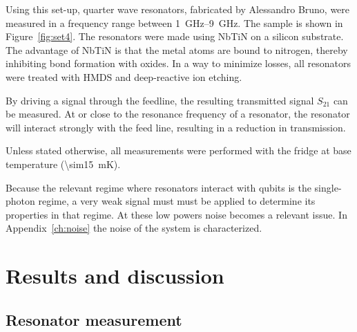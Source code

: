   Using this set-up, quarter wave resonators, fabricated by Alessandro Bruno, were measured in a frequency range between \SIrange{1}{9}{\giga \hertz}. The sample is shown in Figure~\ref{fig:set4}. The resonators were made using NbTiN on a silicon substrate. The advantage of NbTiN is that the metal atoms are bound to nitrogen, thereby inhibiting bond formation with oxides. In a way to minimize losses, all resonators were treated with HMDS and deep-reactive ion etching.

  By driving a signal through the feedline, the resulting transmitted signal $S_{21}$ can be measured. At or close to the resonance frequency of a resonator, the resonator will interact strongly with the feed line, resulting in a reduction in transmission.

  Unless stated otherwise, all measurements were performed with the fridge at base temperature (\SI{\sim15}{\milli \kelvin}).

  Because the relevant regime where resonators interact with qubits is the single-photon regime, a very weak signal must must be applied to determine its properties in that regime. At these low powers noise becomes a relevant issue. In Appendix~\ref{ch:noise} the noise of the system is characterized.

\chapter{Results and discussion}
\label{ch:Results and discussion}


\section{Resonator measurement}

